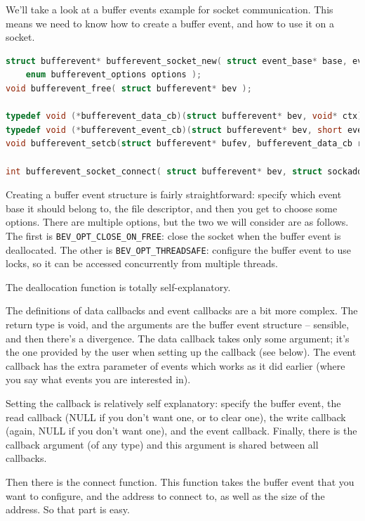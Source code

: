 \documentclass[a4paper]{report}
\begin{document}
We'll take a look at a buffer events example for socket communication. This means we need to know how to create a buffer event, and how to use it on a socket.

\begin{lstlisting}[language=C]
struct bufferevent* bufferevent_socket_new( struct event_base* base, evutil_socket_t fd, 
    enum bufferevent_options options );
void bufferevent_free( struct bufferevent* bev );

typedef void (*bufferevent_data_cb)(struct bufferevent* bev, void* ctx);
typedef void (*bufferevent_event_cb)(struct bufferevent* bev, short events, void* ctx);
void bufferevent_setcb(struct bufferevent* bufev, bufferevent_data_cb readcb, bufferevent_data_cb writecb, bufferevent_event_cb eventcb, void* cbarg);

int bufferevent_socket_connect( struct bufferevent* bev, struct sockaddr* address, int addrlen );
\end{lstlisting}

Creating a buffer event structure is fairly straightforward: specify which event base it should belong to, the file descriptor, and then you get to choose some options. There are multiple options, but the two we will consider are as follows. The first is  \texttt{BEV\_OPT\_CLOSE\_ON\_FREE}: close the socket when the buffer event is deallocated. The other is \texttt{BEV\_OPT\_THREADSAFE}: configure the buffer event to use locks, so it can be accessed concurrently from multiple threads.

The deallocation function is totally self-explanatory.

The definitions of data callbacks and event callbacks are a bit more complex. The return type is void, and the arguments are the buffer event structure -- sensible, and then there's a divergence. The data callback takes only some argument; it's the one provided by the user when setting up the callback (see below). The event callback has the extra parameter of events which works as it did earlier (where you say what events you are interested in).

Setting the callback is relatively self explanatory: specify the buffer event, the read callback (NULL if you don't want one, or to clear one), the write callback (again, NULL if you don't want one), and the event callback. Finally, there is the callback argument (of any type) and this argument is shared between all callbacks.

Then there is the connect function. This function takes the buffer event that you want to configure, and the address to connect to, as well as the size of the address. So that part is easy.
\end{document}
